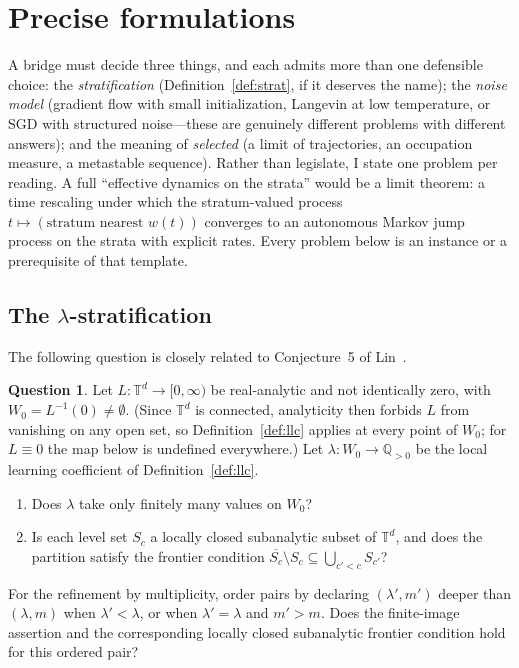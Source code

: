 \documentclass[11pt]{amsart}
\theoremstyle{plain}
\theoremstyle{definition}
\newtheorem{question}[theorem]{Question}
\newcommand{\Q}{\mathbb{Q}}
\newcommand{\T}{\mathbb{T}}
\begin{document}
\section{Precise formulations}\label{sec:precise}

A bridge must decide three things, and each admits more than one defensible choice: the \emph{stratification} (Definition~\ref{def:strat}, if it deserves the name); the \emph{noise model} (gradient flow with small initialization, Langevin at low temperature, or SGD with structured noise---these are genuinely different problems with different answers); and the meaning of \emph{selected} (a limit of trajectories, an occupation measure, a metastable sequence). Rather than legislate, I state one problem per reading. A full ``effective dynamics on the strata'' would be a limit theorem: a time rescaling under which the stratum-valued process $t \mapsto (\text{stratum nearest } w(t))$ converges to an autonomous Markov jump process on the strata with explicit rates. Every problem below is an instance or a prerequisite of that template.

\subsection{The \texorpdfstring{$\lambda$}{lambda}-stratification}\label{sec:strat-problem}

The following question is closely related to Conjecture~5 of Lin~\cite{lin2017}.

\begin{question}\label{q:strat}
Let $L\colon \T^d \to [0,\infty)$ be real-analytic and not identically zero, with $W_0 = L^{-1}(0) \neq \emptyset$. (Since $\T^d$ is connected, analyticity then forbids $L$ from vanishing on any open set, so Definition~\ref{def:llc} applies at every point of $W_0$; for $L \equiv 0$ the map below is undefined everywhere.) Let $\lambda\colon W_0 \to \Q_{>0}$ be the local learning coefficient of Definition~\ref{def:llc}.
\begin{enumerate}
\item[(a)] Does $\lambda$ take only finitely many values on $W_0$?
\item[(b)] Is each level set $S_c$ a locally closed subanalytic subset of $\T^d$, and does the partition satisfy the frontier condition $\overline{S_c} \setminus S_c \subseteq \bigcup_{c' < c} S_{c'}$?
\end{enumerate}
For the refinement by multiplicity, order pairs by declaring $(\lambda',m')$ deeper than $(\lambda,m)$ when $\lambda'<\lambda$, or when $\lambda'=\lambda$ and $m'>m$. Does the finite-image assertion and the corresponding locally closed subanalytic frontier condition hold for this ordered pair?
\end{question}
\end{document}

